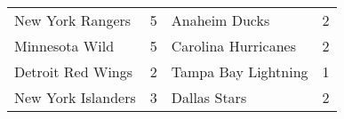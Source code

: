 \begin{tabular}{llll}
\toprule
  New York Rangers & 5 &       Anaheim Ducks & 2 \\
    Minnesota Wild & 5 & Carolina Hurricanes & 2 \\
 Detroit Red Wings & 2 & Tampa Bay Lightning & 1 \\
New York Islanders & 3 &        Dallas Stars & 2 \\
\bottomrule
\end{tabular}
